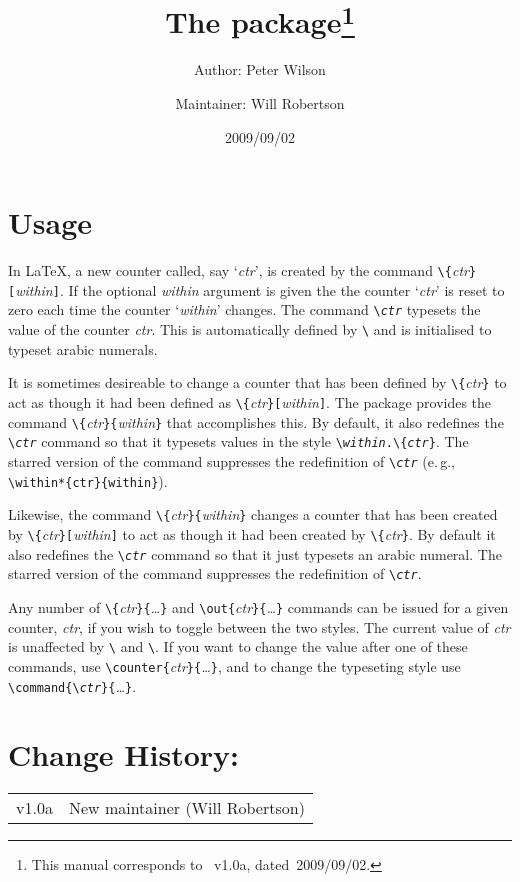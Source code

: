 \documentclass[DIV=7, pagesize=auto]{scrartcl}
\title{The \pkg{chngcntr} package\thanks{This manual corresponds to \pkg{chngcntr}~v1.0a, dated~2009/09/02.}}
\author{Author: Peter Wilson\and Maintainer: Will Robertson}
\date{2009/09/02}
\makeatletter
\newcommand*{\cs}[1]{\texttt{\textbackslash#1}}
\newcommand*{\cmd}[1]{\cs{\expandafter\@gobble\string#1}}
\newcommand*{\meta}[1]{\textlangle\textsl{#1}\textrangle}
\newcommand*{\marg}[1]{\texttt{\{}\meta{#1}\texttt{\}}}
\newcommand*{\oarg}[1]{\texttt{[}\meta{#1}\texttt{]}}
\newcommand*{\ml}[1]{\leavevmode\marginline{\small#1}\ignorespaces}
\makeatother
\begin{document}
\maketitle

\section{Usage}

In \LaTeX, a new counter called, say `\meta{ctr}', is created by the command
\cmd{\newcounter}\marg{ctr}\oarg{within}. If the optional \meta{within} argument is given
the the counter `\meta{ctr}' is reset to zero each time the counter `\meta{within}'
changes. The command \cmd{\the\meta{ctr}} typesets the value of the counter \meta{ctr}.
This is automatically defined by \cmd{\newcounter} and is initialised
to typeset arabic numerals.	

\ml{\cmd{\counterwithin}\\\cmd{\counterwithin*}}
It is sometimes desireable to change a counter that has been defined
by \cmd{\newcounter}\marg{ctr} to act as though it had been defined as 
\cmd{\newcounter}\marg{ctr}\oarg{within}. The package provides the command
\cmd{\counterwithin}\marg{ctr}\marg{within} that accomplishes this. By default,
it also redefines the \cmd{\the\meta{ctr}} command so that it typesets values
in the style \texttt{\cmd{\the\meta{within}}.\cmd{\arabic}\marg{ctr}}. The starred version of the
command suppresses the redefinition of \cmd{\the\meta{ctr}}
(e.\,g., \cmd{\counter\-within*}\verb+{ctr}{within}+).

\ml{\cmd{\counterwithout}\\\cmd{\counterwithout*}}
Likewise, the command \cmd{\counterwithout}\marg{ctr}\marg{within} changes a
counter that has been created by \cmd{\newcounter}\marg{ctr}\oarg{within} to act
as though it had been created by \cmd{\newcounter}\marg{ctr}. By default it
also redefines the \cmd{\the\meta{ctr}} command so that it just typesets an arabic
numeral. The starred version of the command suppresses the redefinition
of \cmd{\the\meta{ctr}}.

Any number of \cmd{\counterwithin}\marg{ctr}\marg{\ldots} and \cmd{\counterwith\-out}\marg{ctr}\marg{\ldots}
commands can be issued for a given counter, \meta{ctr}, if you wish to toggle
between the two styles. The current value of \meta{ctr} is unaffected by
\cmd{\counterwithin} and \cmd{\counterwithout}. If you want to change the value
after one of these commands, use \cmd{\set\-counter}\marg{ctr}\marg{\ldots}, and to change
the typeseting style use \cmd{\renew\-command}\texttt{\{}\cmd{\the\meta{ctr}}\texttt{\}}\marg{\ldots}.


\section{Change History:}

\begin{tabular}{@{}l@{ -- }l@{}}
  v1.0a & New maintainer (Will Robertson)  
\end{tabular}
\end{document}
